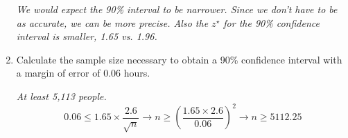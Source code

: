 \documentclass[12pt]{article}
\newcommand{\soln}[2]{\textit{\textcolor{custom_red}{#2}}}{}
\begin{document}
\begin{enumerate}
\soln{2cm}{We would expect the 90\% interval to be narrower. Since we don't have to be as accurate,
we can be more precise. Also the $z^\star$ for the 90\% confidence interval is smaller, 1.65 vs. 1.96.}

\item Calculate the sample size necessary to obtain a 90\% confidence interval with a margin of error of
0.06 hours.

\soln{4cm}{At least 5,113 people.
\[ 
0.06 \le 1.65 \times \frac{2.6}{\sqrt{n}} \rightarrow n \ge \left( \frac{1.65 \times 2.6}{0.06} \right)^2 \rightarrow n \ge 5112.25
\]
}

\end{enumerate}

\end{document}
